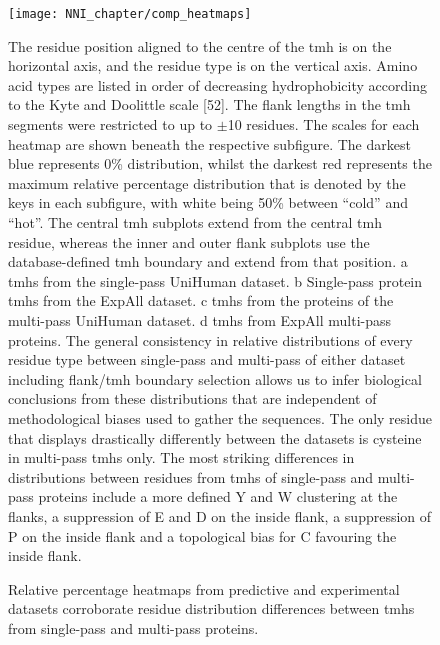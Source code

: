 \begin{figure}[p]
\centering
\texttt{[image: NNI\_chapter/comp\_heatmaps]}
\caption{Relative percentage heatmaps from predictive and experimental datasets corroborate residue distribution differences between \gls{tmh}s from single-pass and multi-pass proteins.}
\medskip
\justify
\footnotesize
The residue position aligned to the centre of the \gls{tmh} is on the horizontal axis, and the residue type is on the vertical axis. Amino acid types are listed in order of decreasing hydrophobicity according to the Kyte and Doolittle scale [52]. The flank lengths in the \gls{tmh} segments were restricted to up to $\pm$10 residues. The scales for each heatmap are shown beneath the respective subfigure. The darkest blue represents 0\% distribution, whilst the darkest red represents the maximum relative percentage distribution that is denoted by the keys in each subfigure, with white being 50\% between “cold” and “hot”. The central \gls{tmh} subplots extend from the central \gls{tmh} residue, whereas the inner and outer flank subplots use the database-defined \gls{tmh} boundary and extend from that position. a \gls{tmh}s from the single-pass UniHuman dataset. b Single-pass protein \gls{tmh}s from the ExpAll dataset. c \gls{tmh}s from the proteins of the multi-pass UniHuman dataset. d \gls{tmh}s from ExpAll multi-pass proteins. The general consistency in relative distributions of every residue type between single-pass and multi-pass of either dataset including flank/\gls{tmh} boundary selection allows us to infer biological conclusions from these distributions that are independent of methodological biases used to gather the sequences. The only residue that displays drastically differently between the datasets is cysteine in multi-pass \gls{tmh}s only. The most striking differences in distributions between residues from \gls{tmh}s of single-pass and multi-pass proteins include a more defined Y and W clustering at the flanks, a suppression of E and D on the inside flank, a suppression of P on the inside flank and a topological bias for C favouring the inside flank.
\label{fig:comp_heatmaps}
\end{figure}

